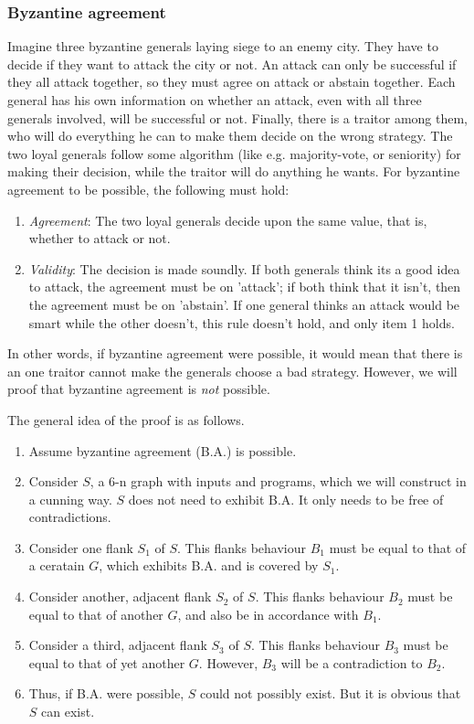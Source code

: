 \subsubsection{Byzantine agreement}
Imagine three byzantine generals laying siege to an enemy city. They have to decide if they want to attack the city or not. An attack can only be successful if they all attack together, so they must agree on attack or abstain together. Each general has his own information on whether an attack, even with all three generals involved, will be successful or not. Finally, there is a traitor among them, who will do everything he can to make them decide on the wrong strategy. The two loyal generals follow some algorithm (like e.g. majority-vote, or seniority) for making their decision, while the traitor will do anything he wants.
For byzantine agreement to be possible, the following must hold:
\begin{enumerate}
    \item \emph{Agreement}: The two loyal generals decide upon the same value, that is, whether to attack or not.
    \item \emph{Validity}: The decision is made soundly. If both generals think its a good idea to attack, the agreement must be on 'attack'; if both think that it isn't, then the agreement must be on 'abstain'. If one general thinks an attack would be smart while the other doesn't, this rule doesn't hold, and only item 1 holds.
\end{enumerate}
In other words, if byzantine agreement were possible, it would mean that there is an one traitor cannot make the generals choose a bad strategy. However, we will proof that byzantine agreement is \emph{not} possible.


The general idea of the proof is as follows. 
\begin{enumerate}
    \item Assume byzantine agreement (B.A.) is possible.
    \item Consider $S$, a 6-n graph with inputs and programs, which we will construct in a cunning way. $S$ does not need to exhibit B.A. It only needs to be free of contradictions.
    \item Consider one flank $S_1$ of $S$. This flanks behaviour $B_1$ must be equal to that of a ceratain $G$, which exhibits B.A. and is covered by $S_1$. 
    \item Consider another, adjacent flank $S_2$ of $S$. This flanks behaviour $B_2$ must be equal to that of another $G$, and also be in accordance with $B_1$. 
    \item Consider a third, adjacent flank $S_3$ of $S$. This flanks behaviour $B_3$ must be equal to that of yet another $G$. However, $B_3$ will be a contradiction to $B_2$.
    \item Thus, if B.A. were possible, $S$ could not possibly exist. But it is obvious that $S$ can exist.
\end{enumerate}


